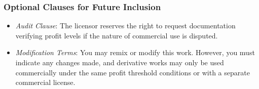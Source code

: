 \documentclass[11pt,a4paper]{article}
\begin{document}
\subsubsection*{Optional Clauses for Future Inclusion}
\begin{itemize}
    \item \textit{Audit Clause}: The licensor reserves the right to request documentation verifying profit levels if the nature of commercial use is disputed.

    \item \textit{Modification Terms}: You may remix or modify this work. However, you must indicate any changes made, and derivative works may only be used commercially under the same profit threshold conditions or with a separate commercial license.
\end{itemize}

\end{document}
